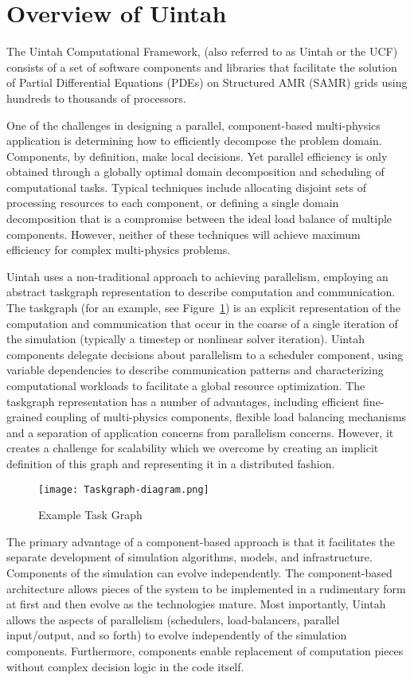 \section{Overview of Uintah} \label{Sec:Overview} 
The Uintah Computational Framework, (also referred to as Uintah or the UCF)
consists of a set of
software components and libraries that facilitate the solution of
Partial Differential Equations (PDEs) on Structured AMR (SAMR) grids
using hundreds to thousands of processors.

One of the challenges in designing a parallel, component-based
multi-physics application is determining how to efficiently decompose
the problem domain. Components, by definition, make local
decisions. Yet parallel efficiency is only obtained through a globally
optimal domain decomposition and scheduling of computational
tasks. Typical techniques include allocating disjoint sets of
processing resources to each component, or defining a single domain
decomposition that is a compromise between the ideal load balance of
multiple components. However, neither of these techniques will achieve
maximum efficiency for complex multi-physics problems.

Uintah uses a non-traditional approach to achieving parallelism,
employing an abstract taskgraph representation to describe computation
and communication. The taskgraph (for an example, see Figure~\ref{fig:TaskGraph}) is an explicit representation of the
computation and communication that occur in the coarse of a single
iteration of the simulation (typically a timestep or nonlinear solver
iteration). Uintah components delegate decisions about parallelism to
a scheduler component, using variable dependencies to describe
communication patterns and characterizing computational workloads to
facilitate a global resource optimization. The taskgraph
representation has a number of advantages, including efficient
fine-grained coupling of multi-physics components, flexible load
balancing mechanisms and a separation of application concerns from
parallelism concerns. However, it creates a challenge for scalability
which we overcome by creating an implicit definition of this graph and
representing it in a distributed fashion.

\begin{figure}
  \texttt{[image: Taskgraph-diagram.png]}
  \caption{Example Task Graph}
  \label{fig:TaskGraph}
\end{figure}

The primary advantage of a component-based approach is that it
facilitates the separate development of simulation algorithms, models,
and infrastructure. Components of the simulation can evolve
independently. The component-based architecture allows pieces of the
system to be implemented in a rudimentary form at first and then
evolve as the technologies mature. Most importantly, Uintah allows the
aspects of parallelism (schedulers, load-balancers, parallel
input/output, and so forth) to evolve independently of the simulation
components. Furthermore, components enable replacement of computation
pieces without complex decision logic in the code itself.


